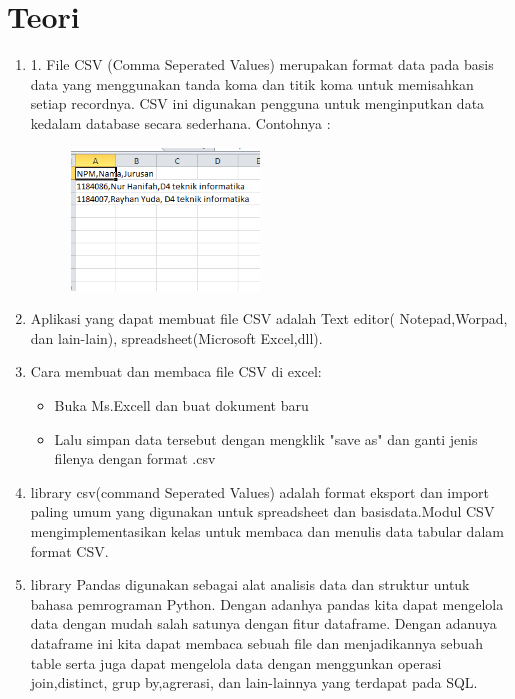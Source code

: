 \chapter*{Teori}

\begin{enumerate}
	\item 1.	File CSV (Comma Seperated Values)  merupakan format data pada basis data yang menggunakan tanda koma  dan titik koma untuk memisahkan setiap recordnya.  CSV ini digunakan pengguna untuk menginputkan data kedalam database secara sederhana.
    Contohnya :
	
	\begin{figure} [h]
	\includegraphics[width=5cm]{poto/poto.png}
	\centering
	\end{figure}		
	
	\item Aplikasi yang dapat membuat file CSV adalah Text editor( Notepad,Worpad, dan lain-lain), spreadsheet(Microsoft Excel,dll).
	
	\item Cara membuat dan membaca file CSV di excel:
	\begin{itemize}
	\item Buka Ms.Excell dan buat dokument baru
	\end{itemize}
	\begin{itemize}
	\item Lalu simpan data tersebut dengan mengklik "save as" dan ganti jenis filenya dengan format .csv
	\end{itemize}

	\item library csv(command Seperated Values) adalah format eksport dan import paling umum yang digunakan untuk spreadsheet dan basisdata.Modul CSV mengimplementasikan kelas untuk membaca dan menulis data tabular dalam format CSV.
	
	
	\item library Pandas digunakan sebagai  alat analisis data dan struktur untuk bahasa pemrograman Python. Dengan adanhya pandas kita dapat mengelola data dengan mudah salah satunya dengan fitur dataframe. Dengan adanuya dataframe ini kita dapat membaca sebuah file dan menjadikannya sebuah table serta juga dapat mengelola data dengan menggunkan operasi join,distinct, grup by,agrerasi, dan lain-lainnya yang terdapat pada SQL.



\end{enumerate}
